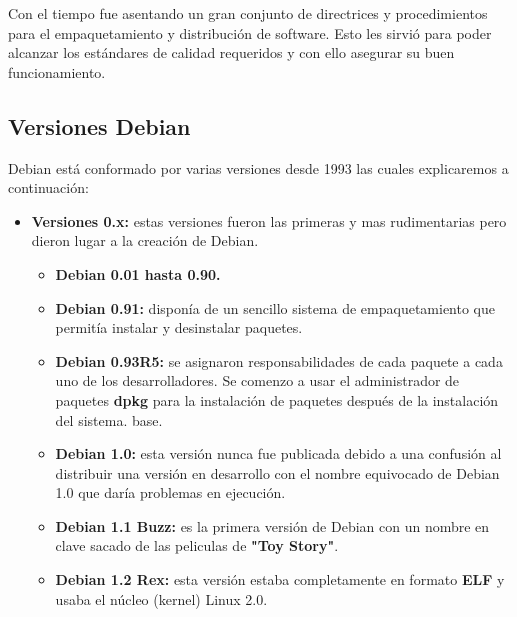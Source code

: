 \documentclass[a4paper, 12pt]{book}
\begin{document}
Con el tiempo fue asentando un gran conjunto de directrices y procedimientos para el empaquetamiento y distribución de software. Esto les sirvió para poder alcanzar los estándares de calidad requeridos y con ello asegurar su buen funcionamiento.

\subsection{Versiones Debian}
\label{subsec:versiones debian}

Debian está conformado por varias versiones desde 1993 las cuales explicaremos a continuación:

\begin{itemize}

	\item \textbf {Versiones 0.x:} estas versiones fueron las primeras y mas rudimentarias pero dieron lugar a la creación de Debian.
	\begin{itemize}
		\item \textbf {Debian 0.01 hasta 0.90.}
		\item \textbf {Debian 0.91:} disponía de un sencillo sistema de empaquetamiento que permitía instalar y desinstalar paquetes.
		\item \textbf {Debian 0.93R5:}  se asignaron responsabilidades de cada paquete a cada uno de los desarrolladores. Se comenzo a usar el administrador de paquetes \textbf {dpkg} para la instalación de paquetes después de la instalación del sistema.
		base.
		\item \textbf {Debian 1.0:} esta versión nunca fue publicada debido a una confusión al distribuir una versión en desarrollo con el nombre equivocado de Debian 1.0 que daría problemas en ejecución.
		\item \textbf {Debian 1.1 Buzz: } es la primera versión de Debian con un nombre en clave sacado de las peliculas de \textbf {"Toy Story"}.
		\item \textbf {Debian 1.2 Rex: } esta versión estaba completamente en formato \textbf{ELF} y usaba el núcleo (kernel) Linux 2.0.
		

\end{itemize}
\end{itemize}
\end{document}
